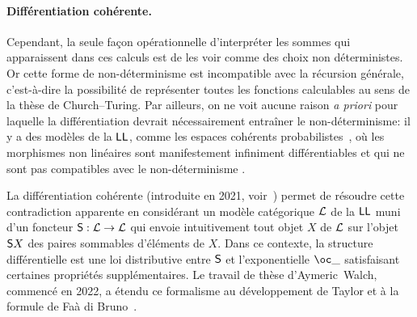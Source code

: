 \documentclass[a4]{article}
\begin{document}


\paragraph*{Différentiation cohérente.}
Cependant, la seule façon opérationnelle d'interpréter les sommes qui
apparaissent dans ces calculs est de les voir comme des choix non
déterministes.
%
Or cette forme de non-déterminisme est incompatible avec la récursion
gé\-né\-ra\-le, c’est-à-dire la possibilité de représenter toutes les
fonctions calculables au sens de la thèse de Church--Turing.
%
%
Par ailleurs, on ne voit aucune raison \emph{a priori} pour laquelle la
différentiation devrait nécessairement entraîner le non-déterminisme:
%
il y a des modèles de la $\hbox{\textsf{LL}}$, comme les espaces cohérents
probabilistes~\cite{DanosEhrhard08}, où les morphismes non linéaires
sont manifestement infiniment différentiables et qui ne sont pas
compatibles avec le non-déterminisme%
% 
.

La différentiation cohérente (introduite en 2021,
voir~\cite{Ehrhard23a}) permet de résoudre cette contradiction
apparente en considérant un modèle catégorique $\mathcal{L}$ de la $\hbox{\textsf{LL}}$ muni
d'un foncteur ${\mathsf S}:\mathcal{L}\to\mathcal{L}$ qui envoie intuitivement tout objet
$X$ de $\mathcal{L}$ sur l'objet ${\mathsf S} X$ des paires sommables d'éléments de
$X$.
%
Dans ce contexte, la structure différentielle est une loi
distributive entre ${\mathsf S}$ et l'exponentielle $\Oc\_$ satisfaisant
certaines propriétés supplémentaires.
%
Le travail de thèse d'Aymeric~Walch, commencé en 2022, a étendu ce
formalisme au développement de Taylor et à la formule de Faà di
Bruno~\cite{EhrhardWalch23b}.
\end{document}
